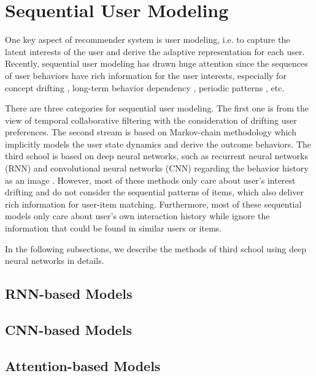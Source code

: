 \section{Sequential User Modeling}
One key aspect of recommender system is user modeling, i.e. to capture the latent interests of the user and derive the adaptive representation for each user\cite{zhou2018deepa,zheng2017joint}.
Recently, sequential user modeling has drawn huge attention since the sequences of user behaviors have rich information for the user interests, especially for concept drifting \cite{widmer1996learning}, long-term behavior dependency \cite{koren2009collaborative,ren2019lifelong}, periodic patterns \cite{ren2018repeatnet}, etc.

There are three categories for sequential user modeling.
The first one is from the view of temporal collaborative filtering \cite{koren2009collaborative} with the consideration of drifting user preferences.
The second stream is based on Markov-chain methodology \cite{rendle2010factorizing,he2016fusing,he2016vista} which implicitly models the user state dynamics and derive the outcome behaviors.
The third school is based on deep neural networks, such as recurrent neural networks (RNN) \cite{hidasi2015session,hidasi2017recurrent,wu2017recurrent,jing2017neural,liu2016context,beutel2018latent,villatel2018recurrent} and convolutional neural networks (CNN) regarding the behavior history as an image \cite{tang2018personalized,kang2018self}.
However, most of these methods only care about user's interest drifting and do not consider the sequential patterns of items, which also deliver rich information for user-item matching.
Furthermore, most of these sequential models only care about user's own interaction history while ignore the information that could be found in similar users or items.

In the following subsections, we describe the methods of third school using deep neural
networks in details.
\subsection{RNN-based Models}
\subsection{CNN-based Models}
\subsection{Attention-based Models}

